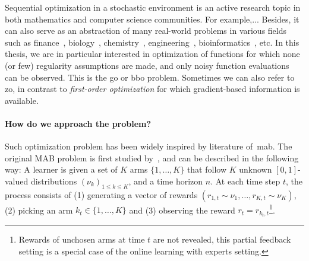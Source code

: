 Sequential optimization in a stochastic environment is an active research topic in both mathematics and computer science communities. For example,... Besides, it can also serve as an abstraction of many real-world problems in various fields such as finance~\citep{ziemba2010}, biology~\citep{durand2018contextual}, chemistry~\citep{floudas2000}, engineering~\citep{wang2007}, bioinformatics~\citep{moles2003}, etc. In this thesis, we are in particular interested in optimization of functions for which none (or few) regularity assumptions are made, and only noisy function evaluations can be observed. This is the \gls{go} or \gls{bbo} problem. Sometimes we can also refer to \gls{zo}, in contrast to \emph{first-order optimization} for which gradient-based information is available.



\paragraph{How do we approach the problem?}

Such optimization problem has been widely inspired by literature of~\gls{mab}. The original MAB problem is first studied by~\cite{thompson1933}, and can be described in the following way: A learner is given a set of $K$ arms $\{1,\ldots,K\}$ that follow $K$ unknown $[0,1]$-valued distributions $(\nu_k)_{1 \leq k \leq K}$, and a time horizon $n$. At each time step $t$, the process consists of (1) generating a vector of rewards $(r_{1,t} \sim \nu_1, \ldots, r_{K,t} \sim \nu_K)$, (2) picking an arm $k_t \in \{1,\ldots,K\}$ and (3) observing the reward $r_t = r_{k_t, t}$\footnote{Rewards of unchosen arms at time $t$ are not revealed, this partial feedback setting is a special case of the online learning with experts setting.}.

